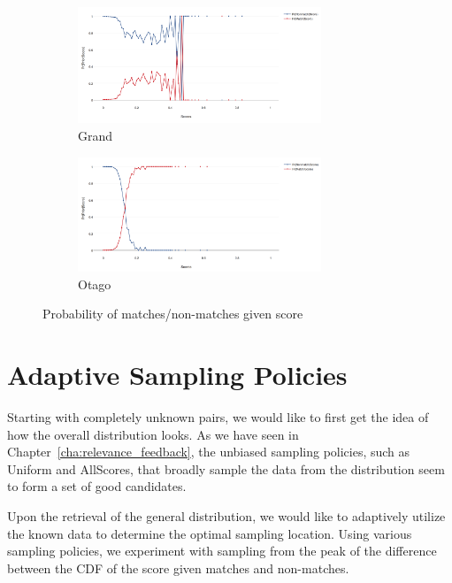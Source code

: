 \begin{figure}[htbp]
  \begin{subfigure}[t]{\textwidth}
    \centering
    \includegraphics[width=0.8\textwidth]{dataset/grand/pms}
    \caption{Grand}
    \label{fig:grand_pms} %
  \end{subfigure}
  \begin{subfigure}[t]{\textwidth}
    \centering
    \includegraphics[width=0.8\textwidth]{dataset/otago/pms}
    \caption{Otago}
    \label{fig:otago_pms} %
  \end{subfigure}
  \caption{Probability of matches/non-matches given score}
  \label{fig:pms} %
\end{figure}

\section{Adaptive Sampling Policies} %
\label{sec:sampling_policies}

Starting with completely unknown pairs, we would like to first get the idea
of how the overall distribution looks. As we have seen in
Chapter~\ref{cha:relevance_feedback}, the unbiased sampling policies, such as
Uniform and AllScores, that broadly sample the data from the distribution seem
to form a set of good candidates.

Upon the retrieval of the general distribution, we would like to adaptively
utilize the known data to determine the optimal sampling location. Using
various sampling policies, we experiment
with sampling from the peak of the difference between the CDF of the score
given matches and non-matches.

